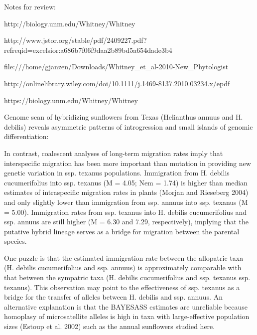 \documentclass[11pt]{article}
\begin{document}
\begin{enumerate}
Notes for review:

http://biology.unm.edu/Whitney/Whitney%

http://www.jstor.org/stable/pdf/2409227.pdf?refreqid=excelsior:a686b7f06f9daa2b89bd5a654dade3b4

file:///home/gjanzen/Downloads/Whitney_et_al-2010-New_Phytologist%

http://onlinelibrary.wiley.com/doi/10.1111/j.1469-8137.2010.03234.x/epdf

https://biology.unm.edu/Whitney/Whitney%

Genome scan of hybridizing sunflowers from Texas
(Helianthus annuus and H. debilis) reveals asymmetric
patterns of introgression and small islands of genomic
differentiation:

In contrast, coalescent analyses of long-term migration
rates imply that interspecific migration has been
more important than mutation in providing new genetic
variation in ssp. texanus populations. Immigration from
H. debilis cucumerifolius into ssp. texanus (M = 4.05;
Nem = 1.74) is higher than median estimates of intraspecific
migration rates in plants (Morjan and Rieseberg 2004) 
and only slightly lower than immigration from
ssp. annuus into ssp. texanus (M = 5.00). Immigration
rates from ssp. texanus into H. debilis cucumerifolius and
ssp. annuus are still higher (M = 6.30 and 7.29, respectively),
implying that the putative hybrid lineage serves
as a bridge for migration between the parental species.

One puzzle is
that the estimated immigration rate between the allopatric
taxa (H. debilis cucumerifolius and ssp. annuus) is
approximately comparable with that between the sympatric
taxa (H. debilis cucumerifolius and ssp. texanus ssp.
texanus). This observation may point to the effectiveness
of ssp. texanus as a bridge for the transfer of alleles
between H. debilis and ssp. annuus. An alternative explanation
is that the BAYESASS estimates are unreliable
because homoplasy of microsatellite alleles is high in
taxa with large-effective population sizes (Estoup et al.
2002) such as the annual sunflowers studied here.


\end{enumerate}
\end{document}
